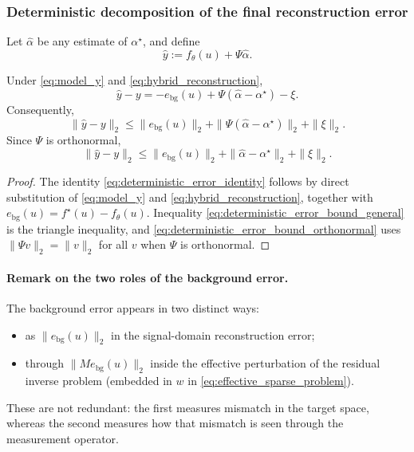 \subsubsection{Deterministic decomposition of the final reconstruction error}

Let $\widehat{\alpha}$ be any estimate of $\alpha^\star$, and define
\begin{equation}
  \widehat{y} := f_\theta(u) + \Psi \widehat{\alpha}.
  \label{eq:hybrid_reconstruction}
\end{equation}

\begin{proposition}
\label{prop:deterministic_decomp_hybrid}
Under \eqref{eq:model_y} and \eqref{eq:hybrid_reconstruction},
\begin{equation}
  \widehat{y} - y
  =
  - e_{\mathrm{bg}}(u) + \Psi(\widehat{\alpha}-\alpha^\star) - \xi.
  \label{eq:deterministic_error_identity}
\end{equation}
Consequently,
\begin{equation}
  \|\widehat{y}-y\|_2
  \le
  \|e_{\mathrm{bg}}(u)\|_2
  +
  \|\Psi(\widehat{\alpha}-\alpha^\star)\|_2
  +
  \|\xi\|_2.
  \label{eq:deterministic_error_bound_general}
\end{equation}
Since $\Psi$ is orthonormal,
\begin{equation}
  \|\widehat{y}-y\|_2
  \le
  \|e_{\mathrm{bg}}(u)\|_2
  +
  \|\widehat{\alpha}-\alpha^\star\|_2
  +
  \|\xi\|_2.
  \label{eq:deterministic_error_bound_orthonormal}
\end{equation}
\end{proposition}

\begin{proof}
The identity \eqref{eq:deterministic_error_identity} follows by direct substitution of \eqref{eq:model_y} and \eqref{eq:hybrid_reconstruction}, together with $e_{\mathrm{bg}}(u)=f^\star(u)-f_\theta(u)$.
Inequality \eqref{eq:deterministic_error_bound_general} is the triangle inequality, and \eqref{eq:deterministic_error_bound_orthonormal} uses $\|\Psi v\|_2=\|v\|_2$ for all $v$ when $\Psi$ is orthonormal.
\end{proof}

\paragraph{Remark on the two roles of the background error.}
The background error appears in two distinct ways:
\begin{itemize}
  \item as $\|e_{\mathrm{bg}}(u)\|_2$ in the signal-domain reconstruction error;
  \item through $\|M e_{\mathrm{bg}}(u)\|_2$ inside the effective perturbation of the residual inverse problem (embedded in $w$ in \eqref{eq:effective_sparse_problem}).
\end{itemize}
These are not redundant: the first measures mismatch in the target space, whereas the second measures how that mismatch is seen through the measurement operator.


